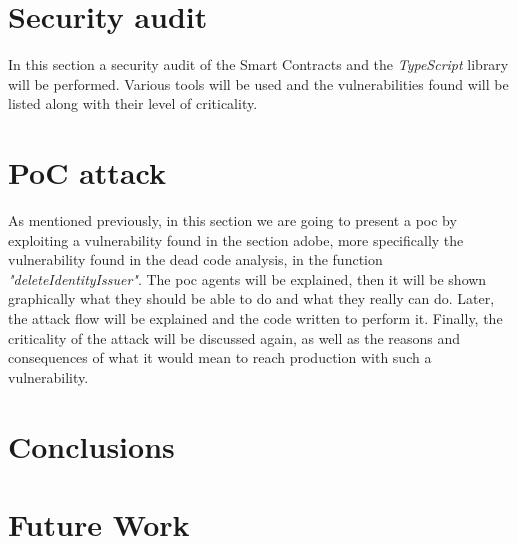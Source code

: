 \documentclass[a4paper, 12pt]{article} %
\begin{document}
\newpage
\section{Security audit}
In this section a security audit of the Smart Contracts and the \textit{TypeScript} library will be performed. Various tools will be used and the vulnerabilities found will be listed along with their level of criticality.




\newpage
\section{PoC attack}
As mentioned previously, in this section we are going to present a \acrfull{poc} by exploiting a vulnerability found in the section adobe, more specifically the vulnerability found in the dead code analysis, in the function \textit{"deleteIdentityIssuer"}. The \acrshort{poc} agents will be explained, then it will be shown graphically what they should be able to do and what they really can do. Later, the attack flow will be explained and the code written to perform it. Finally, the criticality of the attack will be discussed again, as well as the reasons and consequences of what it would mean to reach production with such a vulnerability.






\newpage
\section{Conclusions}


\newpage
\section{Future Work}


\newpage
\printbibliography[heading=bibnumbered] %
\end{document}
